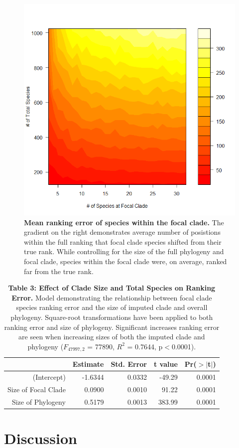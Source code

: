 \documentclass[12pt,english]{article}
\begin{document}
\begin{figure}[!ht]
  \center
  \includegraphics[width=.5\textwidth]{rankingError.png}
  \caption{\textbf{Mean ranking error of species within the focal clade.} The 
  gradient on the right demonstrates average number of posistions within the 
  full ranking that focal clade species shifted from their true rank.
  While controlling for the size of the full phylogeny and focal clade, species 
  within the focal clade were, on average, ranked far from the true rank. }
  \label{rankingError}
\end{figure}

\begin{table}[ht]
  \centering
  \begin{tabular}{rrrrr}
    \hline
   & Estimate & Std. Error & t value & Pr($>$$|$t$|$) \\
    \hline
  (Intercept) & -1.6344 & 0.0332 & -49.29 & 0.0001 \\
    Size of Focal Clade & 0.0900 & 0.0010 & 91.22 & 0.0001 \\
    Size of Phylogeny & 0.5179 & 0.0013 & 383.99 & 0.0001 \\
     \hline
     \hline
  \end{tabular}
  \caption*{\textbf{Table 3: Effect of Clade Size and Total Species on Ranking Error.} 
  Model demonstrating the relationship between focal clade species ranking error 
  and the size of imputed clade and overall phylogeny. Square-root 
  transformations have been applied to both ranking error and size of phylogeny. 
  Significant increases ranking error are seen when increasing sizes of both the
  imputed clade and phylogeny ($F_{47997, 2}$ = 77890, $R^{2}$ = 0.7644, p$<$0.0001).}
  \end{table}

\clearpage
\section*{Discussion}
\end{document}

